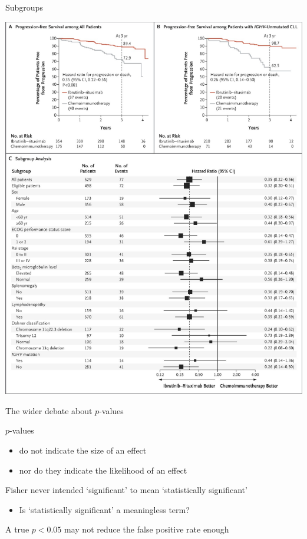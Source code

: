 \documentclass[ignorenonframetext,]{beamer}
\providecommand{\tightlist}{%
  \setlength{\itemsep}{0pt}\setlength{\parskip}{0pt}}
\begin{document}
\begin{frame}{Subgroups}
\protect\hypertarget{subgroups}{}

\centering

\includegraphics{../figures/shanafelt_subgroups.pdf}

\end{frame}

\begin{frame}{The wider debate about \(p\)-values}
\protect\hypertarget{the-wider-debate-about-p-values}{}

\(p\)-values

\begin{itemize}
\item
  do not indicate the size of an effect
\item
  nor do they indicate the likelihood of an effect
\end{itemize}

Fisher never intended `significant' to mean `statistically significant'

\begin{itemize}
\tightlist
\item
  Is `statistically significant' a meaningless term?
\end{itemize}

A true \(p < 0.05\) may not reduce the false positive rate enough

\end{frame}
\end{document}
